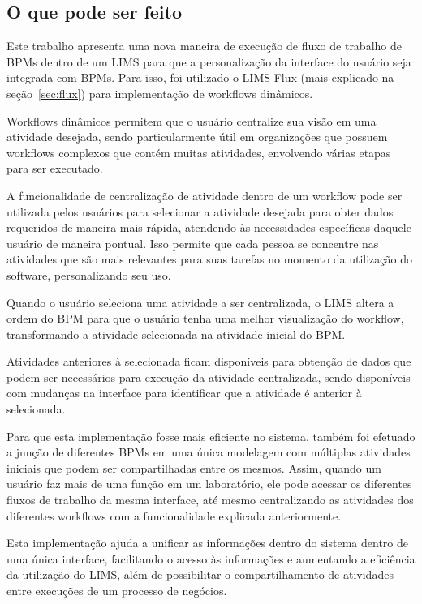 \subsection{O que pode ser feito}


Este trabalho apresenta uma nova maneira de execução de fluxo de trabalho de BPMs dentro de um LIMS para que a personalização da interface do usuário seja integrada com BPMs. Para isso, foi utilizado o LIMS Flux (mais explicado na seção~\ref{sec:flux}) para implementação de workflows dinâmicos.

Workflows dinâmicos permitem que o usuário centralize sua visão em uma atividade desejada, sendo particularmente útil em organizações que possuem workflows complexos que contém muitas atividades, envolvendo várias etapas para ser executado.


A funcionalidade de centralização de atividade dentro de um workflow pode ser utilizada pelos usuários para selecionar a atividade desejada para obter dados requeridos de maneira mais rápida, atendendo às necessidades específicas daquele usuário de maneira pontual. Isso permite que cada pessoa se concentre nas atividades que são mais relevantes para suas tarefas no momento da utilização do software, personalizando seu uso.

Quando o usuário seleciona uma atividade a ser centralizada, o LIMS altera a ordem do BPM para que o usuário tenha uma melhor visualização do workflow, transformando a atividade selecionada na atividade inicial do BPM.

Atividades anteriores à selecionada ficam disponíveis para obtenção de dados que podem ser necessários para execução da atividade centralizada, sendo disponíveis com mudanças na interface para identificar que a atividade é anterior à selecionada.


Para que esta implementação fosse mais eficiente no sistema, também foi efetuado a junção de diferentes BPMs em uma única modelagem com múltiplas atividades iniciais que podem ser compartilhadas entre os mesmos. Assim, quando um usuário faz mais de uma função em um laboratório, ele pode acessar os diferentes fluxos de trabalho da mesma interface, até mesmo centralizando as atividades dos diferentes workflows com a funcionalidade explicada anteriormente.

Esta implementação ajuda a unificar as informações dentro do sistema dentro de uma única interface, facilitando o acesso às informações e aumentando a eficiência da utilização do LIMS, além de possibilitar o compartilhamento de atividades entre execuções de um processo de negócios.



